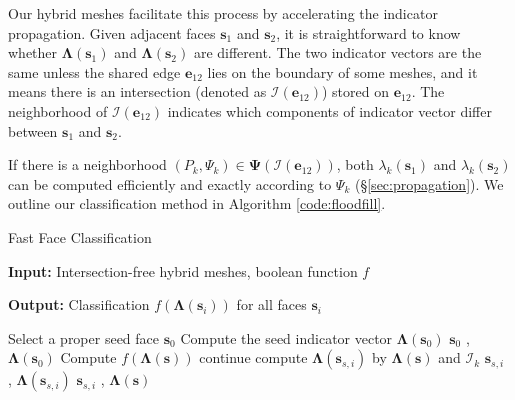 \documentclass[10pt,journal,compsoc]{IEEEtran}
\begin{document}
Our hybrid meshes facilitate this process by accelerating the indicator propagation. Given adjacent faces $\bm{s}_1$ and $\bm{s}_2$, it is straightforward to know whether $\bm{\Lambda}(\bm{s}_1)$ and $\bm{\Lambda}(\bm{s}_2)$ are different. The two indicator vectors are the same unless the shared edge $\bm{e}_{12}$ lies on the boundary of some meshes, and it means there is an intersection (denoted as $\bm{\mathcal{I}}(\bm{e}_{12})$) stored on $\bm{e}_{12}$. The neighborhood of $\bm{\mathcal{I}}(\bm{e}_{12})$ indicates which components of indicator vector differ between $\bm{s}_1$ and $\bm{s}_2$.

If there is a neighborhood $(P_k, \Psi_k) \in \bm{\Psi}(\bm{\mathcal{I}}(\bm{e}_{12}))$, both $\lambda_k(\bm{s}_1)$ and $\lambda_k(\bm{s}_2)$ can be computed efficiently and exactly according to $\Psi_k$ (\S\ref{sec:propagation}). We outline our classification method in Algorithm \ref{code:floodfill}.

\begin{algorithm}
\caption{Fast Face Classification}
\label{code:floodfill}
\textbf{Input: } Intersection-free hybrid meshes, boolean function $f$

\textbf{Output: } Classification $f(\bm{\Lambda}(\bm{s}_i))$ for all faces $\bm{s}_i$


\begin{algorithmic}[1]
\State Select a proper seed face $\bm{s}_0$
\State Compute the seed indicator vector $\boldsymbol{\Lambda}(\bm{s}_0)$
\State {} { $\bm{s}_0$ , $\boldsymbol{\Lambda}(\bm{s}_0)$}
\State
{}
    \State Compute $f(\boldsymbol{\Lambda}(\bm{s}))$
            \State continue
        \EndIf
            \State compute $\boldsymbol{\Lambda}(\bm{s}_{s, i})$ by $\boldsymbol{\Lambda}(\bm{s})$ and ${\bm{\mathcal{I}}}_k$
            \State {} { $\bm{s}_{s, i}$ , $\boldsymbol{\Lambda}(\bm{s}_{s, i})$}
        \Else
            \State {} { $\bm{s}_{s, i}$ , $\boldsymbol{\Lambda}(\bm{s})$}
        \EndIf
    \EndFor
\EndFunction
\end{algorithmic}
\end{algorithm}
\end{document}
